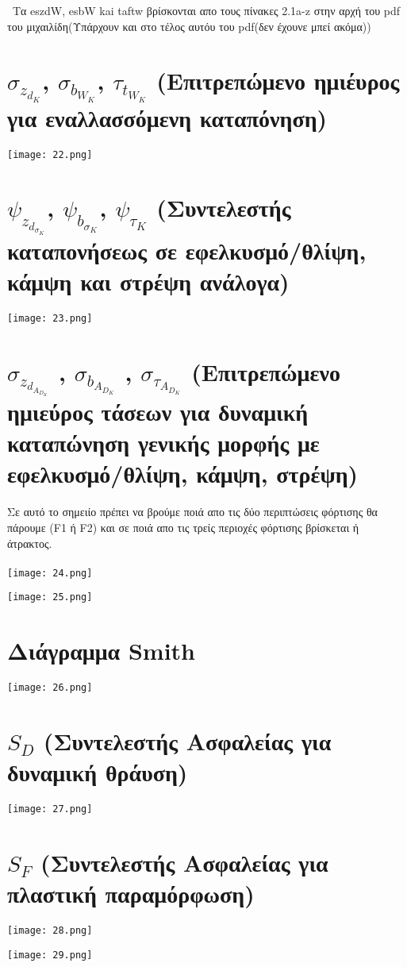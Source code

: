 \documentclass{article}
\begin{document}
\ Τα eszdW, esbW kai taftw βρίσκονται απο τους πίνακες 2.1a-z στην αρχή του pdf του μιχαιλίδη(Υπάρχουν και στο τέλος αυτόυ του pdf(δεν έχουνε μπεί ακόμα))
\\
\section{\textbf{\huge $σ_z_d_K$, $σ_b_W_K$, $τ_t_W_K$}      (Επιτρεπώμενο ημιέυρος για εναλλασσόμενη καταπόνηση) }
\texttt{[image: 22.png]}
\section{\textbf{\huge $ψ_z_d_σ_K$, $ψ_b_σ_K$, $ψ_τ_K$ }   (Συντελεστής καταπονήσεως σε εφελκυσμό/θλίψη, κάμψη και στρέψη ανάλογα) }
\texttt{[image: 23.png]}
\section{\textbf{\huge $σ_z_d_A_D_K$ , $σ_b_A_D_K$ , $σ_τ_A_D_K$}     (Επιτρεπώμενο ημιεύρος τάσεων για δυναμική καταπώνηση γενικής μορφής με εφελκυσμό/θλίψη, κάμψη, στρέψη)}
Σε αυτό το σημειίο πρέπει να βρούμε ποιά απο τις δύο περιπτώσεις φόρτισης θα πάρουμε (F1 ή F2) και σε ποιά απο τις τρείς περιοχές φόρτισης βρίσκεται ή άτρακτος.
\\
\\

\texttt{[image: 24.png]}

\texttt{[image: 25.png]}
\section{\textbf{\huge } Διάγραμμα Smith }
\texttt{[image: 26.png]}
\section{\textbf{\huge $S_D$ }    (Συντελεστής Ασφαλείας για δυναμική θράυση) }
\texttt{[image: 27.png]}
\section{\textbf{\huge  $S_F$}     (Συντελεστής Ασφαλείας για πλαστική παραμόρφωση) }
\texttt{[image: 28.png]}

\texttt{[image: 29.png]}
\end{document}
